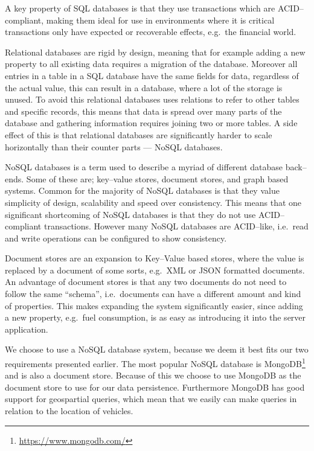 A key property of SQL databases is that they use transactions which are ACID--compliant\cite{Haerder:1983:PTD:289.291}, making them ideal for use in environments where it is critical transactions only have expected or recoverable effects, e.g.~the financial world.

Relational databases are rigid by design, meaning that for example adding a new property to all existing data requires a migration of the database.
Moreover all entries in a table in a SQL database have the same fields for data, regardless of the actual value, this can result in a database, where a lot of the storage is unused.
To avoid this relational databases uses relations to refer to other tables and specific records, this means that data is spread over many parts of the database and gathering information requires joining two or more tables.
A side effect of this is that relational databases are significantly harder to scale horizontally than their counter parts --- NoSQL databases.

\bigskip
NoSQL databases is a term used to describe a myriad of different database back--ends.
Some of these are; key--value stores, document stores, and graph based systems.
Common for the majority of NoSQL databases is that they value simplicity of design, scalability and speed over consistency.
This means that one significant shortcoming of NoSQL databases is that they do not use ACID--compliant transactions.
However many NoSQL databases are ACID--like, i.e.~read and write operations can be configured to show consistency.

Document stores are an expansion to Key--Value based stores, where the value is replaced by a document of some sorts, e.g.~XML or JSON formatted documents.
An advantage of document stores is that any two documents do not need to follow the same ``schema'', i.e.~documents can have a different amount and kind of properties.
This makes expanding the system significantly easier, since adding a new property, e.g.~fuel consumption, is as easy as introducing it into the server application.

\bigskip
We choose to use a NoSQL database system, because we deem it best fits our two requirements presented earlier.
The most popular NoSQL database is MongoDB\footnote{\url{https://www.mongodb.com/}} and is also a document store.\cite{DB_RANKINGS}
Because of this we choose to use MongoDB as the document store to use for our data persistence.
Furthermore MongoDB has good support for geospartial queries, which mean that we easily can make queries in relation to the location of vehicles.


